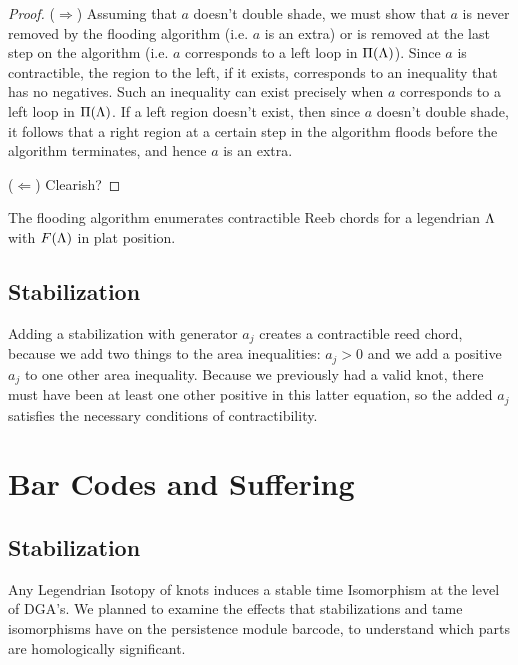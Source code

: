 \documentclass[11pt,oneside]{amsart}
\begin{document}
\begin{proof}
    ($\Rightarrow$) Assuming that $a$ doesn't double shade, we must show that $a$ is never removed by the flooding algorithm (i.e. $a$ is an extra) or is removed at the last step on the algorithm (i.e. $a$ corresponds to a left loop in $\Pi(\Lambda)$). Since $a$ is contractible, the region to the left, if it exists, corresponds to an inequality that has no negatives. Such an inequality can exist precisely when $a$ corresponds to a left loop in $\Pi(\Lambda)$. If a left region doesn't exist, then since $a$ doesn't double shade, it follows that a right region at a certain step in the algorithm floods before the algorithm terminates, and hence $a$ is an extra.

    ($\Leftarrow$) Clearish?
\end{proof}

\begin{corollary}
    \label{cor:contractenum}
    The flooding algorithm enumerates contractible Reeb chords for a legendrian $\Lambda$ with $F(\Lambda)$ in plat position.
\end{corollary}


\subsection{Stabilization}
Adding a stabilization with generator $a_j$ creates a contractible reed chord, because we add two things to the area inequalities: $a_j>0$ and we add a positive $a_j$ to one other area inequality. Because we previously had a valid knot, there must have been at least one other positive in this latter equation, so the added $a_j$ satisfies the necessary conditions of contractibility. 



\section{Bar Codes and Suffering}

\subsection{Stabilization}

    Any Legendrian Isotopy of knots induces a stable time Isomorphism at the level of DGA's.  We planned to examine the effects that stabilizations and tame isomorphisms have on the persistence module barcode, to understand which parts are homologically significant. 
    
\end{document}
